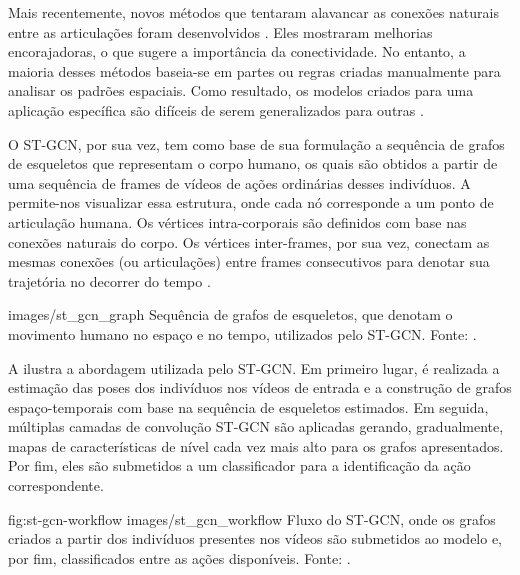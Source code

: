 
Mais recentemente, novos métodos que tentaram alavancar as conexões naturais entre as articulações foram desenvolvidos \cite{shahroudy-2016, yong-du-2015}. Eles mostraram melhorias encorajadoras, o que sugere a importância da conectividade. No entanto, a maioria desses métodos baseia-se em partes ou regras criadas manualmente para analisar os padrões espaciais. Como resultado, os modelos criados para uma aplicação específica são difíceis de serem generalizados para outras \cite{st-gcn-2018}.

O ST-GCN, por sua vez, tem como base de sua formulação a sequência de grafos de esqueletos que representam o corpo humano, os quais são obtidos a partir de uma sequência de frames de vídeos de ações ordinárias desses indivíduos. A  permite-nos visualizar essa estrutura, onde cada nó corresponde a um ponto de articulação humana. Os vértices intra-corporais são definidos com base nas conexões naturais do corpo. Os vértices inter-frames, por sua vez, conectam as mesmas conexões (ou articulações) entre frames consecutivos para denotar sua trajetória no decorrer do tempo \cite{st-gcn-2018}.

    {images/st_gcn_graph}
    {Sequência de grafos de esqueletos, que denotam o movimento humano no espaço e no tempo, utilizados pelo ST-GCN. Fonte: \cite[p. 1]{st-gcn-2018}.}

A  ilustra a abordagem utilizada pelo ST-GCN. Em primeiro lugar, é realizada a estimação das poses dos indivíduos nos vídeos de entrada e a construção de grafos espaço-temporais com base na sequência de esqueletos estimados. Em seguida, múltiplas camadas de convolução ST-GCN são aplicadas gerando, gradualmente, mapas de características de nível cada vez mais alto para os grafos apresentados. Por fim, eles são submetidos a um classificador para a identificação da ação correspondente.

\image
    {fig:st-gcn-workflow}
    {images/st_gcn_workflow}
    {Fluxo do ST-GCN, onde os grafos criados a partir dos indivíduos presentes nos vídeos são submetidos ao modelo e, por fim, classificados entre as ações disponíveis. Fonte: \cite[p. 3]{st-gcn-2018}.}

